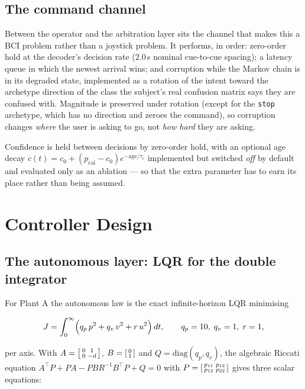 \documentclass[11pt,a4paper]{article}
\theoremstyle{plain}
\theoremstyle{definition}
\begin{document}
\subsection{The command channel}

Between the operator and the arbitration layer sits the channel that
makes this a BCI problem rather than a joystick problem. It performs, in
order: zero-order hold at the decoder's decision rate
($2.0$\,s nominal cue-to-cue spacing); a latency queue in which the
newest arrival wins; and corruption while the Markov chain is in its
degraded state, implemented as a rotation of the intent toward the
archetype direction of the class the subject's real confusion matrix
says they are confused with. Magnitude is preserved under rotation
(except for the \texttt{stop} archetype, which has no direction and
zeroes the command), so corruption changes \emph{where} the user is
asking to go, not \emph{how hard} they are asking.

Confidence is held between decisions by zero-order hold, with an
optional age decay
$c(t) = c_0 + (p_{\mathrm{cal}} - c_0)e^{-\mathrm{age}/\tau_c}$
implemented but switched \emph{off} by default and evaluated only as an
ablation --- so that the extra parameter has to earn its place rather
than being assumed.

\section{Controller Design}
\label{sec:control}

\subsection{The autonomous layer: LQR for the double integrator}
\label{sec:lqr}

For Plant A the autonomous law is the exact infinite-horizon LQR
minimising

\begin{equation}
J = \int_0^\infty \Bigl( q_p\,p^2 + q_v\,v^2 + r\,u^2 \Bigr)\,dt,
\qquad q_p = 10,\; q_v = 1,\; r = 1,
\end{equation}

per axis. With $A = \begin{bsmallmatrix}0 & 1\\ 0 & -d\end{bsmallmatrix}$,
$B = \begin{bsmallmatrix}0\\1\end{bsmallmatrix}$ and
$Q = \mathrm{diag}(q_p, q_v)$, the algebraic Riccati equation
$A^{\!\top} P + PA - PBR^{-1}B^{\!\top}P + Q = 0$ with
$P = \begin{bsmallmatrix}p_{11} & p_{12}\\ p_{12} & p_{22}\end{bsmallmatrix}$
gives three scalar equations:
\end{document}
